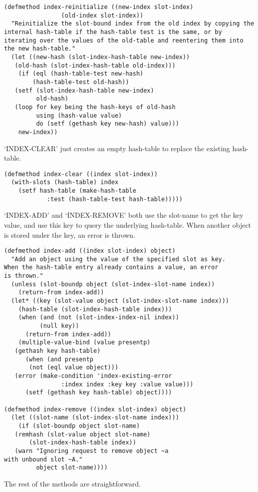 \begin{Verbatim}[fontsize=\small,frame=leftline,framerule=0.9mm,rulecolor=\color{gray},framesep=5.1mm,xleftmargin=5mm,fontfamily=cmtt]
(defmethod index-reinitialize ((new-index slot-index)
                (old-index slot-index))
  "Reinitialize the slot-bound index from the old index by copying the
internal hash-table if the hash-table test is the same, or by
iterating over the values of the old-table and reentering them into
the new hash-table."
  (let ((new-hash (slot-index-hash-table new-index))
   (old-hash (slot-index-hash-table old-index)))
    (if (eql (hash-table-test new-hash)
        (hash-table-test old-hash))
   (setf (slot-index-hash-table new-index)
         old-hash)
   (loop for key being the hash-keys of old-hash
         using (hash-value value)
         do (setf (gethash key new-hash) value)))
    new-index))
\end{Verbatim}
`INDEX-CLEAR' just creates an empty hash-table to replace the
existing hash-table.

\begin{Verbatim}[fontsize=\small,frame=leftline,framerule=0.9mm,rulecolor=\color{gray},framesep=5.1mm,xleftmargin=5mm,fontfamily=cmtt]
(defmethod index-clear ((index slot-index))
  (with-slots (hash-table) index
    (setf hash-table (make-hash-table
            :test (hash-table-test hash-table)))))
\end{Verbatim}
`INDEX-ADD' and `INDEX-REMOVE' both use the slot-name to get the
key value, and use this key to query the underlying
hash-table. When another object is stored under the key, an error
is thrown.

\begin{Verbatim}[fontsize=\small,frame=leftline,framerule=0.9mm,rulecolor=\color{gray},framesep=5.1mm,xleftmargin=5mm,fontfamily=cmtt]
(defmethod index-add ((index slot-index) object)
  "Add an object using the value of the specified slot as key.
When the hash-table entry already contains a value, an error
is thrown."
  (unless (slot-boundp object (slot-index-slot-name index))
    (return-from index-add))
  (let* ((key (slot-value object (slot-index-slot-name index)))
    (hash-table (slot-index-hash-table index)))
    (when (and (not (slot-index-index-nil index))
          (null key))
      (return-from index-add))
    (multiple-value-bind (value presentp)
   (gethash key hash-table)
      (when (and presentp
       (not (eql value object)))
   (error (make-condition 'index-existing-error
                :index index :key key :value value)))
      (setf (gethash key hash-table) object))))

(defmethod index-remove ((index slot-index) object)
  (let ((slot-name (slot-index-slot-name index)))
    (if (slot-boundp object slot-name)
   (remhash (slot-value object slot-name)
       (slot-index-hash-table index))
   (warn "Ignoring request to remove object ~a
with unbound slot ~A."
         object slot-name))))
\end{Verbatim}
The rest of the methods are straightforward.


